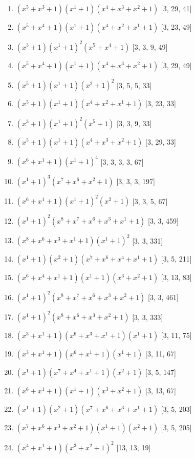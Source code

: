 \documentclass[10pt,twocolumn]{article}
\begin{document}
\begin{enumerate}
\item $(x^{5} + x^{3} + 1)(x^{1} + 1)(x^{4} + x^{3} + x^{2} + 1)$  [3, 29, 41]
\item $(x^{5} + x^{4} + 1)(x^{1} + 1)(x^{4} + x^{2} + x^{1} + 1)$  [3, 23, 49]
\item $(x^{3} + 1)(x^{1} + 1)^{2}(x^{5} + x^{4} + 1)$  [3, 3, 9, 49]
\item $(x^{5} + x^{4} + 1)(x^{1} + 1)(x^{4} + x^{3} + x^{2} + 1)$  [3, 29, 49]
\item $(x^{5} + 1)(x^{1} + 1)(x^{2} + 1)^{2}$  [3, 5, 5, 33]
\item $(x^{5} + 1)(x^{1} + 1)(x^{4} + x^{2} + x^{1} + 1)$  [3, 23, 33]
\item $(x^{3} + 1)(x^{1} + 1)^{2}(x^{5} + 1)$  [3, 3, 9, 33]
\item $(x^{5} + 1)(x^{1} + 1)(x^{4} + x^{3} + x^{2} + 1)$  [3, 29, 33]
\item $(x^{6} + x^{1} + 1)(x^{1} + 1)^{4}$  [3, 3, 3, 3, 67]
\item $(x^{1} + 1)^{3}(x^{7} + x^{6} + x^{2} + 1)$  [3, 3, 3, 197]
\item $(x^{6} + x^{1} + 1)(x^{1} + 1)^{2}(x^{2} + 1)$  [3, 3, 5, 67]
\item $(x^{1} + 1)^{2}(x^{8} + x^{7} + x^{6} + x^{3} + x^{1} + 1)$  [3, 3, 459]
\item $(x^{8} + x^{6} + x^{3} + x^{1} + 1)(x^{1} + 1)^{2}$  [3, 3, 331]
\item $(x^{1} + 1)(x^{2} + 1)(x^{7} + x^{6} + x^{4} + x^{1} + 1)$  [3, 5, 211]
\item $(x^{6} + x^{4} + x^{1} + 1)(x^{1} + 1)(x^{3} + x^{2} + 1)$  [3, 13, 83]
\item $(x^{1} + 1)^{2}(x^{8} + x^{7} + x^{6} + x^{3} + x^{2} + 1)$  [3, 3, 461]
\item $(x^{1} + 1)^{2}(x^{8} + x^{6} + x^{3} + x^{2} + 1)$  [3, 3, 333]
\item $(x^{3} + x^{1} + 1)(x^{6} + x^{3} + x^{1} + 1)(x^{1} + 1)$  [3, 11, 75]
\item $(x^{3} + x^{1} + 1)(x^{6} + x^{1} + 1)(x^{1} + 1)$  [3, 11, 67]
\item $(x^{1} + 1)(x^{7} + x^{4} + x^{1} + 1)(x^{2} + 1)$  [3, 5, 147]
\item $(x^{6} + x^{1} + 1)(x^{1} + 1)(x^{3} + x^{2} + 1)$  [3, 13, 67]
\item $(x^{1} + 1)(x^{2} + 1)(x^{7} + x^{6} + x^{3} + x^{1} + 1)$  [3, 5, 203]
\item $(x^{7} + x^{6} + x^{3} + x^{2} + 1)(x^{1} + 1)(x^{2} + 1)$  [3, 5, 205]
\item $(x^{4} + x^{1} + 1)(x^{3} + x^{2} + 1)^{2}$  [13, 13, 19]

\end{enumerate}
\end{document}
